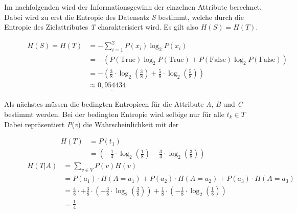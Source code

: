 Im nachfolgenden wird der Informationsgewinn der einzelnen Attribute berechnet. Dabei wird zu erst die Entropie des Datensatz \textit{S} bestimmt, welche durch die Entropie des Zielattributes \textit{T} charakterisiert wird. Es gilt also $H(S) = H(T)$.

\begin{figure}[htbp]
    \centering
    \begin{align*}
        H(S) = H(T) &= - \sum\limits_{i=1}^{2} P(x_{i}) \log_{2} P(x_{i}) \\
                    &= - ( P(\text{True}) \log_{2} P(\text{True}) + P(\text{False}) \log_{2} P(\text{False}) ) \\
                    &= - \left( \frac{3}{8} \cdot \log_{2} \left(\frac{3}{8}\right) + \frac{5}{8} \cdot \log_{2} \left(\frac{5}{8}\right)\right)\\
                    &\approx \underline{0,954434}
    \end{align*}
\end{figure}

Als nächstes müssen die bedingten Entropieen für die Attribute \textit{A}, \textit{B} und \textit{C} bestimmt werden. Bei der bedingten Entropie wird selbige nur für alle $t_{k}\in T$
Dabei repräsentiert \textit{P}(\textit{v}) die Wahrscheinlichkeit mit der 

\begin{figure}[htbp]
    \begin{align*}
        H(T)  &=  P(t_{1})  \\
                    &=  \left( -\frac{1}{4} \cdot \log_{2}\left(\frac{1}{8}\right) - %
                        \frac{3}{4} \cdot \log_{2}\left(\frac{3}{8}\right) \right)
    \end{align*}
    \begin{align*}
        H(T\vert A) &= \sum\limits_{v\in V}P(v)H(v) \\
                    &= P(a_{1}) \cdot H(A=a_{1}) + P(a_{2}) \cdot H(A=a_{2}) + P(a_{3}) \cdot H(A=a_{3}) \\
                    &=  \frac{4}{8} \cdot  + %
                        \frac{3}{8} \cdot \left( -\frac{3}{8} \cdot \log_{2}\left(\frac{3}{8}\right) \right) + %
                        \frac{1}{8} \cdot \left( -\frac{1}{8} \cdot \log_{2}\left(\frac{1}{8}\right) \right) \\
                    &= \frac{1}{4}
    \end{align*}
    \caption{\autocite{DataMining}}
\end{figure}

